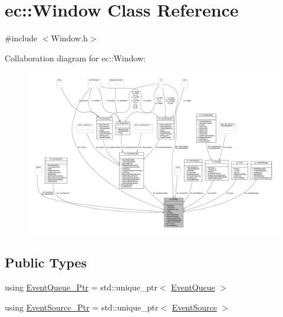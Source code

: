 \hypertarget{classec_1_1_window}{}\section{ec\+:\+:Window Class Reference}
\label{classec_1_1_window}


{\ttfamily \#include $<$Window.\+h$>$}



Collaboration diagram for ec\+:\+:Window\+:
\nopagebreak
\begin{figure}[H]
\begin{center}
\leavevmode
\includegraphics[width=350pt]{classec_1_1_window__coll__graph}
\end{center}
\end{figure}
\subsection*{Public Types}
\begin{DoxyCompactItemize}
\item 
using \mbox{\hyperlink{classec_1_1_window_afe0927efdedc84c345120ae15bf6994a}{Event\+Queue\+\_\+\+Ptr}} = std\+::unique\+\_\+ptr$<$ \mbox{\hyperlink{classec_1_1_event_queue}{Event\+Queue}} $>$
\item 
using \mbox{\hyperlink{classec_1_1_window_ae7501526590ece55dbe92ea496e62738}{Event\+Source\+\_\+\+Ptr}} = std\+::unique\+\_\+ptr$<$ \mbox{\hyperlink{classec_1_1_event_source}{Event\+Source}} $>$
\end{DoxyCompactItemize}
